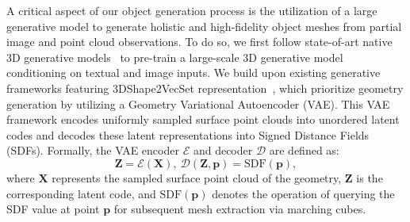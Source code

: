A critical aspect of our object generation process is the utilization of a large generative model to generate holistic and high-fidelity object meshes from partial image and point cloud observations. To do so, we first follow state-of-art native 3D generative models~\cite{xiang2024structured,zhang20233dshape2vecset,zhang2024clay} to pre-train a large-scale 3D generative model conditioning on textual and image inputs. %
%
We build upon existing generative frameworks featuring 3DShape2VecSet representation~\cite{zhang20233dshape2vecset,zhang2024clay}, which prioritize geometry generation by utilizing a Geometry Variational Autoencoder (VAE). This VAE framework encodes uniformly sampled surface point clouds into unordered latent codes and decodes these latent representations into Signed Distance Fields (SDFs). Formally, the VAE encoder $\mathcal{E}$ and decoder $\mathcal{D}$ are defined as:
\begin{equation}
    \bm{Z}=\mathcal{E}(\bm{X}),\ \mathcal{D}(\bm{Z},\bm{p}) = \text{SDF}(\bm{p}),
\end{equation}
where $\bm{X}$ represents the sampled surface point cloud of the geometry, $\bm{Z}$ is the corresponding latent code, and $\text{SDF}(\bm{p})$  denotes the operation of querying the SDF value at point $\bm{p}$ for subsequent mesh extraction via marching cubes.
